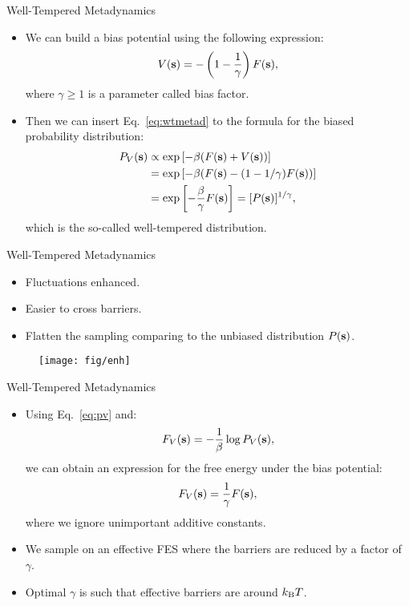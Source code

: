 \documentclass[10pt]{beamer}
\begin{document}
\begin{frame}{Well-Tempered Metadynamics}
\begin{itemize}
\setlength\itemsep{1em}
  \item We can build a bias potential using the following expression:
  \begin{equation}
    V({\bf s})=-\left( 1-\frac{1}{\gamma} \right) F({\bf s}),
  \label{eq:wtmetad}
  \end{equation}
  where $\gamma\geq 1$ is a parameter called bias factor.

  \item Then we can insert Eq.~\ref{eq:wtmetad} to the formula for the biased probability distribution:
  \begin{align}
    P_V({\bf s}) & \propto \exp\left[ -\beta(F({\bf s})+V({\bf s})) \right] \nonumber\\
             & = \exp\left[ -\beta(F({\bf s})-(1-1/\gamma)F({\bf s})) \right] \nonumber\\
             & = \exp\left[ -\frac{\beta}{\gamma} F({\bf s}) \right] = [P({\bf s})]^{1/\gamma},
  \label{eq:pv}
  \end{align}
  which is the so-called well-tempered distribution.
\end{itemize}
\end{frame}

\begin{frame}{Well-Tempered Metadynamics}
\begin{itemize}
\setlength\itemsep{1em}
  \item Fluctuations enhanced.
  \item Easier to cross barriers.
  \item Flatten the sampling comparing to the unbiased distribution $P({\bf s})$.
\end{itemize}
\begin{figure}
  \texttt{[image: fig/enh]}
\end{figure}
\end{frame}

\begin{frame}{Well-Tempered Metadynamics}
\begin{itemize}
\setlength\itemsep{1em}
  \item Using Eq.~\ref{eq:pv} and:
  \begin{equation}
    F_V({\bf s}) = -\frac{1}{\beta}\log P_V({\bf s}),
  \end{equation}
  we can obtain an expression for the free energy under the bias potential:
  \begin{equation}
    F_V({\bf s}) = \frac{1}{\gamma} F({\bf s}),
  \end{equation}
  where we ignore unimportant additive constants.

  \item We sample on an effective FES where the barriers are reduced by a factor of $\gamma$.

  \item Optimal $\gamma$ is such that effective barriers are around $k_\mathrm{B}T$.
\end{itemize}
\end{frame}
\end{document}
